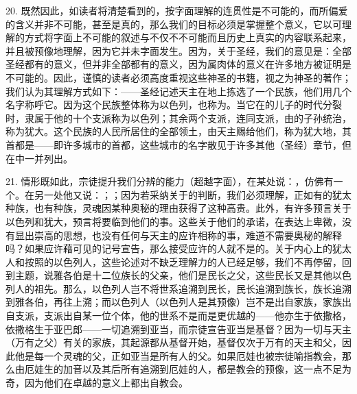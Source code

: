 20. 既然因此，如读者将清楚看到的，按字面理解的连贯性是不可能的，而所偏爱的含义并非不可能，甚至是真的，那么我们的目标必须是掌握整个意义，它以可理解的方式将字面上不可能的叙述与不仅不不可能而且历史上真实的内容联系起来，并且被预像地理解，因为它并未字面发生。因为，关于圣经，我们的意见是：全部圣经都有的意义，但并非全部都有的意义，因为属肉体的意义在许多地方被证明是不可能的。因此，谨慎的读者必须高度重视这些神圣的书籍，视之为神圣的著作；我们认为其理解方式如下：——圣经记述天主在地上拣选了一个民族，他们用几个名字称呼它。因为这个民族整体称为以色列，也称为。当它在的儿子的时代分裂时，隶属于他的十个支派称为以色列；其余两个支派，连同支派，由的子孙统治，称为犹大。这个民族的人民所居住的全部领土，由天主赐给他们，称为犹大地，其首都是——即许多城市的首都，这些城市的名字散见于许多其他（圣经）章节，但在中一并列出。\newline{}\par

21. 情形既如此，宗徒提升我们分辨的能力（超越字面），在某处说：，仿佛有一个。在另一处他又说：；；因为若采纳关于的判断，我们必须理解，正如有的犹太种族，也有种族，灵魂因某种奥秘的理由获得了这种高贵。此外，有许多预言关于以色列和犹大，预言将要临到他们的事。这些关于他们的承诺，在表达上卑微，没有显出崇高的思想，也没有任何与天主的应许相称的事，难道不需要奥秘的解释吗？如果应许藉可见的记号宣告，那么接受应许的人就不是的。关于内心上的犹太人和按照的以色列人，这些论述对不缺乏理解力的人已经足够，我们不再停留，回到主题，说雅各伯是十二位族长的父亲，他们是民长之父，这些民长又是其他以色列人的祖先。那么，以色列人岂不将世系追溯到民长，民长追溯到族长，族长追溯到雅各伯，再往上溯；而以色列人（以色列人是其预像）岂不是出自家族，家族出自支派，支派出自某一位个体，他的世系不是而是更优越的——他亦生于依撒格，依撒格生于亚巴郎——一切追溯到亚当，而宗徒宣告亚当是基督？因为一切与天主（万有之父）有关的家族，其起源都从基督开始，基督仅次于万有的天主和父，因此他是每一个灵魂的父，正如亚当是所有人的父。如果厄娃也被宗徒喻指教会，那么由厄娃生的加音以及其后所有追溯到厄娃的人，都是教会的预像，这一点不足为奇，因为他们在卓越的意义上都出自教会。\par

